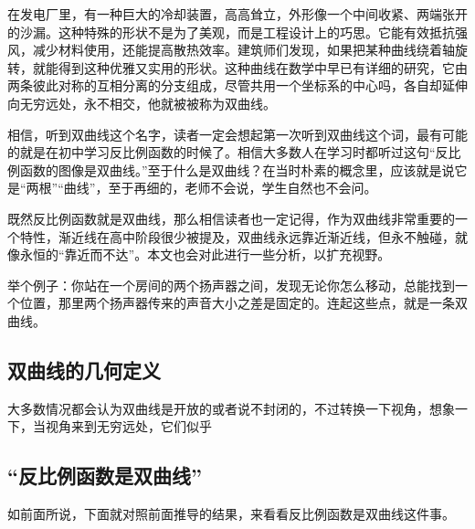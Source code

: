 
\begin{issues}
\issueDraft
\end{issues}


在发电厂里，有一种巨大的冷却装置，高高耸立，外形像一个中间收紧、两端张开的沙漏。这种特殊的形状不是为了美观，而是工程设计上的巧思。它能有效抵抗强风，减少材料使用，还能提高散热效率。建筑师们发现，如果把某种曲线绕着轴旋转，就能得到这种优雅又实用的形状。这种曲线在数学中早已有详细的研究，它由两条彼此对称的互相分离的分支组成，尽管共用一个坐标系的中心吗，各自却延伸向无穷远处，永不相交，他就被被称为双曲线。

相信，听到双曲线这个名字，读者一定会想起第一次听到双曲线这个词，最有可能的就是在初中学习反比例函数的时候了。相信大多数人在学习时都听过这句“反比例函数的图像是双曲线。”至于什么是双曲线？在当时朴素的概念里，应该就是说它是“两根”“曲线”，至于再细的，老师不会说，学生自然也不会问。

既然反比例函数就是双曲线，那么相信读者也一定记得，作为双曲线非常重要的一个特性，渐近线在高中阶段很少被提及，双曲线永远靠近渐近线，但永不触碰，就像永恒的“靠近而不达”。本文也会对此进行一些分析，以扩充视野。

举个例子：你站在一个房间的两个扬声器之间，发现无论你怎么移动，总能找到一个位置，那里两个扬声器传来的声音大小之差是固定的。连起这些点，就是一条双曲线。

\subsection{双曲线的几何定义}

大多数情况都会认为双曲线是开放的或者说不封闭的，不过转换一下视角，想象一下，当视角来到无穷远处，它们似乎

\subsection{“反比例函数是双曲线”}

如前面所说，下面就对照前面推导的结果，来看看反比例函数是双曲线这件事。

